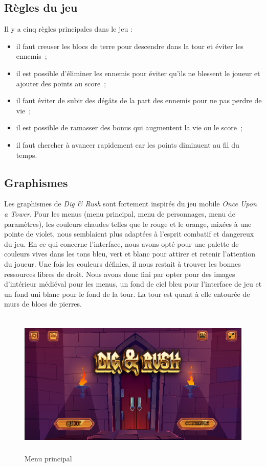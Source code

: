 \documentclass[a4paper,12pt]{article}
\begin{document}
\subsection{Règles du jeu}
Il y a cinq règles principales dans le jeu :
\begin{itemize}
	\item il faut creuser les blocs de terre pour descendre dans la tour et éviter les ennemis ;
	\item il est possible d’éliminer les ennemis pour éviter qu’ils ne blessent le joueur et ajouter des points au score ;
	\item il faut éviter de subir des dégâts de la part des ennemis pour ne pas perdre de vie ;
	\item il est possible de ramasser des bonus qui augmentent la vie ou le score ;
	\item il faut chercher à avancer rapidement car les points diminuent au fil du temps.
\end{itemize}

\subsection{Graphismes}
Les graphismes de \textit{Dig \& Rush} sont fortement inspirés du jeu mobile \textit{Once Upon a Tower}.
Pour les menus (menu principal, menu de personnages, menu de paramètres), les couleurs  chaudes telles que le rouge et le orange, mixées à une pointe de violet, nous semblaient plus adaptées à l'esprit combatif et dangereux du jeu. 
En ce qui concerne l'interface, nous avons opté pour une palette de couleurs vives dans les tons bleu, vert et blanc pour attirer et retenir l'attention du joueur.
Une fois les couleurs définies, il nous restait à trouver les bonnes ressources libres de droit. Nous avons donc fini par opter pour des images d'intérieur médiéval pour les menus, un fond de ciel bleu pour l'interface de jeu et un fond uni blanc pour le fond de la tour.
La tour est quant à elle entourée de murs de blocs de pierres.
\begin{figure}[h]
	\centering
	\includegraphics[height=7cm]{img/menu.png}
	\caption{Menu principal}
	\label{menu}
\end{figure}
\end{document}
